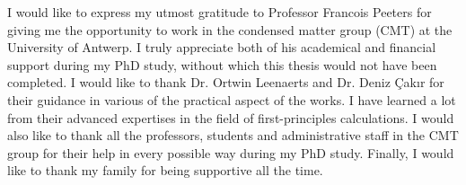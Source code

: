 
\begin{acknowledgements}      


I would like to express my utmost gratitude to Professor Francois Peeters for giving me the opportunity to work in the condensed matter group (CMT) at the University of Antwerp. I truly appreciate both of his academical and financial support during my PhD study, without which this thesis would not have been completed. I would like to thank Dr. Ortwin Leenaerts and Dr. Deniz Çakır for their guidance in various of the practical aspect of the works. I have learned a lot from their advanced expertises in the field of first-principles calculations. I would also like to thank all the professors, students and administrative staff in the CMT group for their help in every possible way during my PhD study. Finally, I would like to thank my family for being supportive all the time.

\end{acknowledgements}
